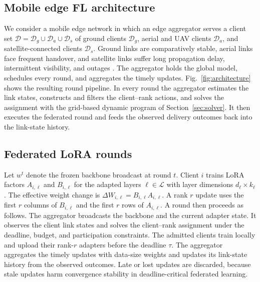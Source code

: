 \documentclass[preprint,12pt]{elsarticle}
\begin{document}
\subsection{Mobile edge FL architecture}
We consider a mobile edge network in which an edge aggregator serves a client set
$\mathcal{D}=\mathcal{D}_g\cup\mathcal{D}_a\cup\mathcal{D}_s$ of ground clients $\mathcal{D}_g$, aerial and UAV clients $\mathcal{D}_a$, and satellite-connected clients $\mathcal{D}_s$. Ground links are comparatively stable, aerial links face frequent handover, and satellite links suffer long propagation delay, intermittent visibility, and outages \cite{mahboob2024ntn,razmi2022ground}. The aggregator holds the global model, schedules every round, and aggregates the timely updates. Fig.~\ref{fig:architecture} shows the resulting round pipeline. In every round the aggregator estimates the link states, constructs and filters the client--rank actions, and solves the assignment with the grid-based dynamic program of Section~\ref{sec:solver}. It then executes the federated round and feeds the observed delivery outcomes back into the link-state history.

\subsection{Federated LoRA rounds}
Let $w^t$ denote the frozen backbone broadcast at round $t$. Client $i$ trains LoRA factors $A_{i,\ell}$ and $B_{i,\ell}$ for the adapted layers $\ell\in\mathcal L$ with layer dimensions $d_\ell\times k_\ell$. The effective weight change is $\Delta W_{i,\ell}=B_{i,\ell}A_{i,\ell}$. A rank $r$ update uses the first $r$ columns of $B_{i,\ell}$ and the first $r$ rows of $A_{i,\ell}$. A round then proceeds as follows. The aggregator broadcasts the backbone and the current adapter state. It observes the client link states and solves the client--rank assignment under the deadline, budget, and participation constraints. The admitted clients train locally and upload their rank-$r$ adapters before the deadline $\tau$. The aggregator aggregates the timely updates with data-size weights and updates its link-state history from the observed outcomes. Late or lost updates are discarded, because stale updates harm convergence stability in deadline-critical federated learning.
\end{document}
